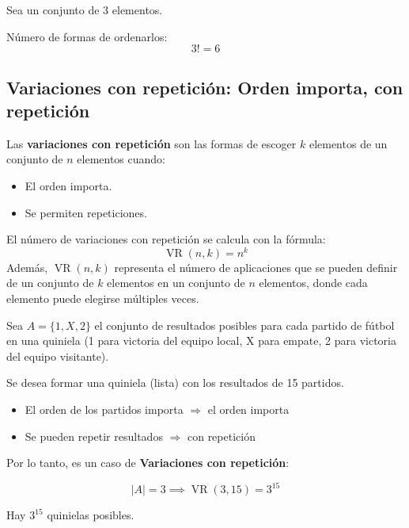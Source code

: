 \documentclass[a4paper,12pt]{article}
\begin{document}
\begin{ejemplo}[title=Ejemplo de permutaciones ordinarias]
Sea un conjunto de 3 elementos.  

Número de formas de ordenarlos:
\[
3! = 6
\]
\end{ejemplo}

\subsection{Variaciones con repetición: Orden importa, con repetición}

\begin{procedimiento}[title=Definición de variaciones con repetición]
Las \textbf{variaciones con repetición} son las formas de escoger $k$ elementos de un conjunto de $n$ elementos cuando:
\begin{itemize}
    \item El orden importa.
    \item Se permiten repeticiones.
\end{itemize}

El número de variaciones con repetición se calcula con la fórmula:
\[
\operatorname{VR}(n,k) = n^k
\]
Además, $\operatorname{VR}(n,k)$ representa el número de aplicaciones que se pueden definir de un conjunto de $k$ elementos en un conjunto de $n$ elementos, donde cada elemento puede elegirse múltiples veces.
\end{procedimiento}

\begin{ejemplo}[title=Ejemplo: Quiniela]
Sea $A = \{1, X, 2\}$ el conjunto de resultados posibles para cada partido de fútbol en una quiniela (1 para victoria del equipo local, X para empate, 2 para victoria del equipo visitante).  

Se desea formar una quiniela (lista) con los resultados de 15 partidos.  

\begin{itemize}
    \item El orden de los partidos importa $\Rightarrow$ el orden importa
    \item Se pueden repetir resultados $\Rightarrow$ con repetición
\end{itemize}

Por lo tanto, es un caso de \textbf{Variaciones con repetición}:

\[
|A| = 3 \implies \operatorname{VR}(3,15) = 3^{15}
\]

Hay $3^{15}$ quinielas posibles.
\end{ejemplo}
\end{document}
